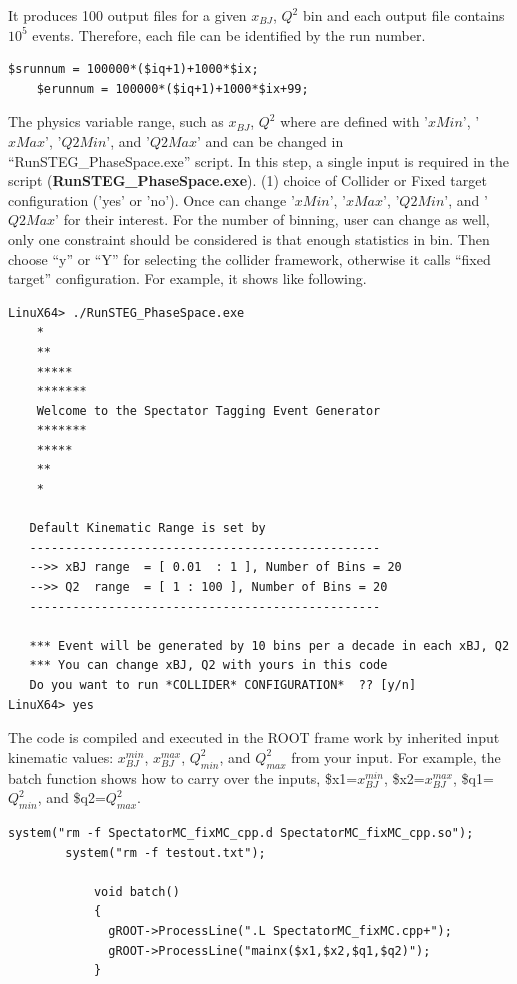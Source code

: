 \documentclass[12pt,letterpaper]{article}
\begin{document}
It produces 100 output files for a given $x_{BJ}$, $Q^2$ bin and each output file contains $10^5$ events. Therefore, each file can be identified by the run number.
\fontsize{9}{9}
\begin{Verbatim}[frame=single]
	$srunnum = 100000*($iq+1)+1000*$ix;
	$erunnum = 100000*($iq+1)+1000*$ix+99;
\end{Verbatim}

The physics variable range, such as $x_{BJ}$, $Q^2$ where are defined with '$xMin$', '$xMax$', '$Q2Min$', and '$Q2Max$' and can be changed in ``RunSTEG\_PhaseSpace.exe'' script.
In this step, a single input is required in the script (\textbf{RunSTEG\_PhaseSpace.exe}). (1) choice of Collider or Fixed target configuration ('yes' or 'no').
Once can change '$xMin$', '$xMax$', '$Q2Min$', and '$Q2Max$' for their interest. For the number of binning, user can change as well, only one constraint should be considered is that enough statistics in bin.
Then choose ``y'' or ``Y'' for selecting the collider framework, otherwise it calls ``fixed target'' configuration.  For example, it shows like following.

\fontsize{9}{9}
\begin{Verbatim}[frame=single]
 LinuX64> ./RunSTEG_PhaseSpace.exe 
    *
    **
    *****
    *******
    Welcome to the Spectator Tagging Event Generator 
    *******
    *****
    **
    *
 
   Default Kinematic Range is set by 
   -------------------------------------------------
   -->> xBJ range  = [ 0.01  : 1 ], Number of Bins = 20 
   -->> Q2  range  = [ 1 : 100 ], Number of Bins = 20  
   -------------------------------------------------

   *** Event will be generated by 10 bins per a decade in each xBJ, Q2
   *** You can change xBJ, Q2 with yours in this code
   Do you want to run *COLLIDER* CONFIGURATION*  ?? [y/n]
LinuX64> yes
\end{Verbatim}


The code is compiled and executed in the ROOT frame work by inherited input kinematic values: $x_{BJ}^{min}$, $x_{BJ}^{max}$, $Q^2_{min}$, and $Q^2_{max}$ from your input. For example, the batch\(\) function shows how to carry over the inputs, \$x1=$x_{BJ}^{min}$, \$x2=$x_{BJ}^{max}$, \$q1=$Q^2_{min}$, and \$q2=$Q^2_{max}$.
\fontsize{9}{9}
\begin{Verbatim}[frame=single]
	    system("rm -f SpectatorMC_fixMC_cpp.d SpectatorMC_fixMC_cpp.so");
	    system("rm -f testout.txt");

            void batch()
            {
              gROOT->ProcessLine(".L SpectatorMC_fixMC.cpp+");
              gROOT->ProcessLine("mainx($x1,$x2,$q1,$q2)");
            }
\end{Verbatim}
\end{document}

